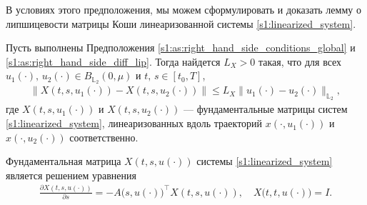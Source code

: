 \documentclass[../main.tex]{subfiles}
\begin{document}
В условиях этого предположения, мы можем сформулировать и доказать лемму о липшицевости матрицы Коши линеаризованной системы \eqref{s1:linearized_system}.
\begin{lemma}\label{s1:lem:lip_fundumental_matrix}
    Пусть выполнены Предположения \ref{s1:as:right_hand_side_conditions_global} и \ref{s1:as:right_hand_side_diff_lip}.
    Тогда найдется $L_X > 0 $ такая, что для всех $u_1(\cdot),\, u_2(\cdot) \in B_{\mathbb{L}_2}(0,\mu)$ и $t, \, s  \in [t_0,T]$, 
    \begin{gather*}
        \Big\|X(t,s,u_1(\cdot)) - X(t,s,u_2(\cdot)) \Big\| \leqslant L_X \| u_1(\cdot) - u_2(\cdot) \|_{\mathbb{L}_2},
    \end{gather*}
    где $X(t,s,u_1(\cdot)) $ и $X(t,s,u_2(\cdot)) $ --- фундаментальные матрицы систем \eqref{s1:linearized_system}, линеаризованных вдоль траекторий $x(\cdot, u_1(\cdot)) $ и $x(\cdot, u_2(\cdot)) $ соответственно. 
\end{lemma}
\doc
Фундаментальная матрица $X(t,s,u(\cdot)) $  системы \eqref{s1:linearized_system} является решением уравнения
\begin{gather*}
    \frac{\partial X(t, s, u(\cdot))}{\partial s} = -A\big(s,u(\cdot)\big)^{\top} X(t, s, u(\cdot)), \quad X\big(t, t, u(\cdot)\big) = I.
\end{gather*}
        
\end{document}
